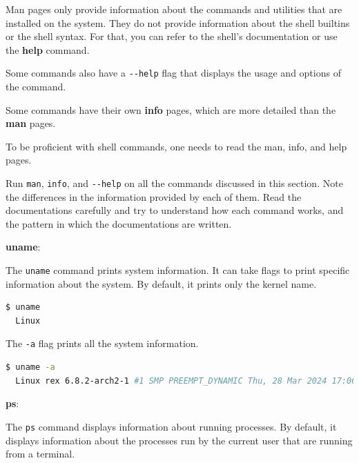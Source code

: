 Man pages only provide information about the commands and utilities that are installed on the system. They do not provide information about the shell builtins or the shell syntax. For that, you can refer to the shell's documentation or use the \textbf{help} command.

Some commands also have a \texttt{-{}-{}help} flag that displays the usage and options of the command.

Some commands have their own \textbf{info} pages, which are more detailed than the \textbf{man} pages.

To be proficient with shell commands, one needs to read the man, info, and help pages.

\begin{exercise}
  Run \texttt{man}, \texttt{info}, and \texttt{-{}-help} on all the commands discussed in this section.
  Note the differences in the information provided by each of them.
  Read the documentations carefully and try to understand how each command works, and the pattern in which the documentations are written.
\end{exercise}

\textbf{uname}:

The \texttt{uname} command prints system information.
It can take flags to print specific information about the system.
By default, it prints only the kernel name.

\begin{lstlisting}[language=bash]
  $ uname
  Linux
\end{lstlisting}

The \texttt{-a} flag prints all the system information.

\begin{lstlisting}[language=bash]
  $ uname -a
  Linux rex 6.8.2-arch2-1 #1 SMP PREEMPT_DYNAMIC Thu, 28 Mar 2024 17:06:35 +0000 x86_64 GNU/Linux
\end{lstlisting}

\textbf{ps}:

The \texttt{ps} command displays information about running processes.
By default, it displays information about the processes run by the current user that are running from a terminal.

